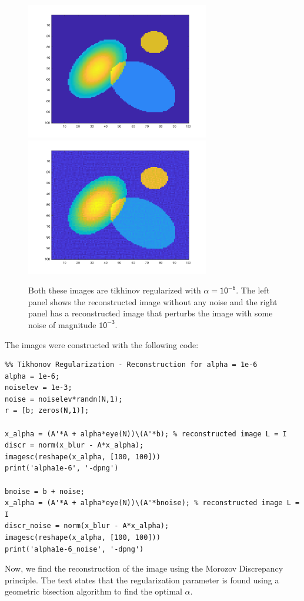 \documentclass{article}
\begin{document}
\begin{figure}[H]
\centerline{
\includegraphics[width = 8cm]{alpha1e-6.png} \includegraphics[width = 8cm]{alpha1e-6_noise.png}
}
\caption{\label{fig:Figure 4} Both these images are tikhinov regularized with $\mathsf{\alpha = 10^{-6}}$. The left panel shows the reconstructed image without any noise and the right panel has a reconstructed image that perturbs the image with some noise of magnitude $\mathsf{10^{-3}}$.}
\end{figure}

The images were constructed with the following code:

\begin{verbatim}
%% Tikhonov Regularization - Reconstruction for alpha = 1e-6
alpha = 1e-6;
noiselev = 1e-3;
noise = noiselev*randn(N,1);
r = [b; zeros(N,1)];

x_alpha = (A'*A + alpha*eye(N))\(A'*b); % reconstructed image L = I
discr = norm(x_blur - A*x_alpha);
imagesc(reshape(x_alpha, [100, 100]))
print('alpha1e-6', '-dpng')

bnoise = b + noise;
x_alpha = (A'*A + alpha*eye(N))\(A'*bnoise); % reconstructed image L = I
discr_noise = norm(x_blur - A*x_alpha);
imagesc(reshape(x_alpha, [100, 100]))
print('alpha1e-6_noise', '-dpng')
\end{verbatim}

Now, we find the reconstruction of the image using the Morozov Discrepancy principle. The text states that the regularization parameter is found using a geometric bisection algorithm to find the optimal $\alpha$. 
\end{document}
